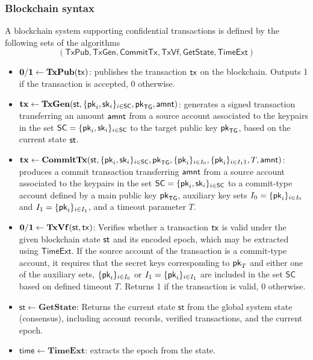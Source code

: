 \subsubsection{Blockchain syntax}
\begin{definition} A blockchain system supporting confidential transactions is defined by the following sets of the algorithms \[(\mathsf{TxPub}, \mathsf{TxGen}, \mathsf{CommitTx}, \mathsf{TxVf}, \mathsf{GetState}, \mathsf{TimeExt})\]
\begin{itemize}[topsep=0pt, itemsep=0pt, leftmargin=2em]
    \item $\mathbf{0/1} \gets \mathbf{TxPub}(\mathsf{tx})$: publishes the transaction $\mathsf{tx}$ on the blockchain. Outputs 1 if the transaction is accepted, 0 otherwise.
    \item $\mathbf{tx}  \gets \mathbf{TxGen}(\st, \{ \pk_i, \sk_i \}_{i \in \mathsf{SC}}, \pk_\mathsf{TG}, \amnt)$: generates a signed transaction transferring an amount $\mathsf{amnt}$ from a source account associated to the keypairs in the set $\mathsf{SC} = \{\mathsf{pk}_i, \mathsf{sk}_i \}_{i \in \mathsf{SC}}$ to the target public key $\mathsf{pk}_\mathsf{TG}$, based on the current state $\st$.
    \item $\mathbf{tx} \gets \mathbf{CommitTx}(\st,  \{ \pk_i, \sk_i \}_{i \in \mathsf{SC}}, \mathsf{pk}_\mathsf{TG}, \{ \pk_i \}_{i \in I_0}, \{ \pk_i \}_{i \in I_11}, T, \amnt)$: produces a commit transaction transferring $\mathsf{amnt}$ from a source account associated to the keypairs in the set $\mathsf{SC} = \{\mathsf{pk}_i, \mathsf{sk}_i \}_{i \in \mathsf{SC}}$  to a commit-type account defined by a main public key $\mathsf{pk}_\mathsf{TG}$, auxiliary key sets $I_0 = \{ \mathsf{pk}_i \}_{i \in I_0}$ and $I_1 = \{ \mathsf{pk}_i \}_{i \in I_1}$, and a timeout parameter $T$.
    \item $\mathbf{0/1} \gets \mathbf{TxVf}(\st, \tx)$: Verifies whether a transaction $\mathsf{tx}$ is valid under the given blockchain state $\st$ and its encoded epoch, which may be extracted using $\mathsf{TimeExt}$. If the source account of the transaction is a commit-type account, it requires that the secret keys corresponding to $\mathsf{pk}_T$ and either one of the auxiliary sets, $\{ \mathsf{pk}_i \}_{i \in I_0}$ or  $I_1 = \{ \mathsf{pk}_i \}_{i \in I_1}$ are included in the set $\mathsf{SC}$ based on defined timeout $T$. Returns 1 if the transaction is valid, 0 otherwise.
    \item $\mathsf{st} \gets \mathbf{GetState}$: Returns the current state $\mathsf{st}$ from the global system state (consensus), including account records, verified transactions, and the current epoch.
    \item $\mathsf{time} \gets \mathbf{TimeExt}$: extracts the epoch from the state.
\end{itemize}
\end{definition}
